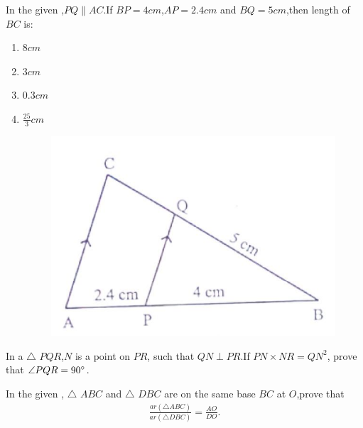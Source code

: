     \item  In the given ,$PQ \parallel AC$.If $BP = 4 cm$,$AP = 2.4 cm$ and $BQ = 5 cm$,then length of $BC$ is:
    \begin{enumerate}[label=(\alph*)]
        \item $8 cm$
        \item $3 cm$
        \item $0.3 cm$
        \item $\frac{25}{3}cm$
          \begin{figure}[H]
  \centering
  \includegraphics[width=\columnwidth]{figs/right angle triangle.jpeg}
  \caption{}
  \label{fig:right angle triangle.jpeg}
\end{figure}
    \end{enumerate}
		\pagebreak
       \item  In a $\triangle$  $PQR$,$N$ is a point on $PR$, such that $QN \perp PR$.If $PN \times NR = QN^2$, prove that $\angle PQR = 90 \degree$.
    \item   In the given , $\triangle$ $ABC$ and  $\triangle$ $DBC$ are on the same base $BC$ at $O$,prove that
    \begin{align}
         \frac{ar (\triangle  ABC)}{ar (\triangle DBC)} = \frac{AO}{DO}.
    \end{align}
